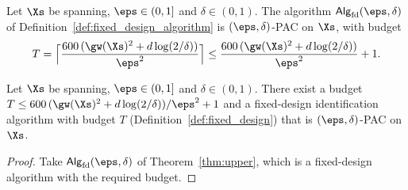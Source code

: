 \begin{theorem}\label{thm:upper}
\leanok
{}
Let $\Xs$ be spanning, $\eps \in (0,1]$ and $\delta \in (0,1)$. The algorithm
$\mathsf{Alg}_{\mathrm{fd}}(\eps,\delta)$
of Definition~\ref{def:fixed_design_algorithm} is $(\eps,\delta)$-PAC on $\Xs$, with budget
\[
  T = \Big\lceil \frac{600\,(\gw(\Xs)^2 + d\log(2/\delta))}{\eps^2} \Big\rceil
  \le \frac{600\,(\gw(\Xs)^2 + d\log(2/\delta))}{\eps^2} + 1 .
\]
\end{theorem}

\begin{corollary}\label{cor:upper_exists}
\leanok
{}
Let $\Xs$ be spanning, $\eps \in (0,1]$ and $\delta \in (0,1)$. There exist a budget
$T \le 600\,(\gw(\Xs)^2 + d\log(2/\delta))/\eps^2 + 1$ and a fixed-design identification
algorithm with budget $T$ (Definition~\ref{def:fixed_design}) that is $(\eps,\delta)$-PAC on
$\Xs$.
\end{corollary}
\begin{proof}
\leanok
\leanok
{}
Take $\mathsf{Alg}_{\mathrm{fd}}(\eps,\delta)$ of Theorem~\ref{thm:upper}, which is a fixed-design
algorithm with the required budget.
\end{proof}

